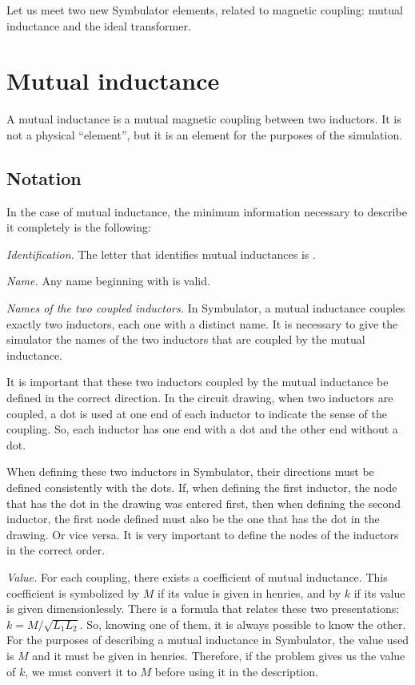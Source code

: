 Let us meet two new Symbulator elements, related to magnetic
coupling: mutual inductance and the ideal transformer.

\section{Mutual inductance}

A mutual inductance is a mutual magnetic coupling between two
inductors. It is not a physical ``element'', but it is an element
for the purposes of the simulation.

\subsection{Notation}

In the case of mutual inductance, the minimum information necessary
to describe it completely is the following:

\emph{Identification.} The letter that identifies mutual inductances
is .

\emph{Name.} Any name beginning with  is valid.

\emph{Names of the two coupled inductors.} In Symbulator, a mutual
inductance couples exactly two inductors, each one with a distinct
name. It is necessary to give the simulator the names of the two
inductors that are coupled by the mutual inductance.

It is important that these two inductors coupled by the mutual
inductance be defined in the correct direction. In the circuit
drawing, when two inductors are coupled, a dot is used at one end of
each inductor to indicate the sense of the coupling. So, each
inductor has one end with a dot and the other end without a dot.

When defining these two inductors in Symbulator, their directions
must be defined consistently with the dots. If, when defining the
first inductor, the node that has the dot in the drawing was entered
first, then when defining the second inductor, the first node
defined must also be the one that has the dot in the drawing. Or
vice versa. It is very important to define the nodes of the
inductors in the correct order.

\emph{Value.} For each coupling, there exists a coefficient of
mutual inductance. This coefficient is symbolized by $M$ if its
value is given in henries, and by $k$ if its value is given
dimensionlessly. There is a formula that relates these two
presentations: $k = M/\sqrt{L_1 L_2}$. So, knowing one of them, it
is always possible to know the other. For the purposes of describing
a mutual inductance in Symbulator, the value used is $M$ and it must
be given in henries. Therefore, if the problem gives us the value of
$k$, we must convert it to $M$ before using it in the description.

